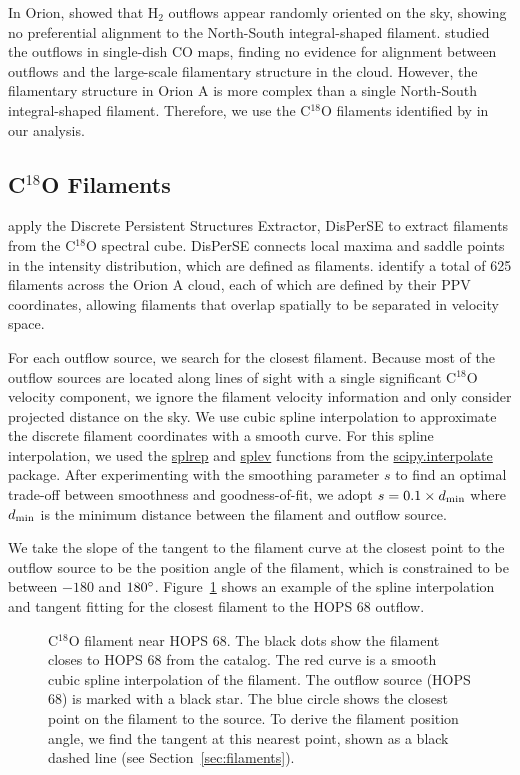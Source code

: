 \documentclass[twocolumn]{aastex63}
\newcommand{\example}{HOPS 68}
\begin{document}
In Orion, \citet{Davis09} showed that H$_{2}$ outflows appear randomly oriented on the sky, showing no preferential alignment to the North-South integral-shaped filament. \citet{Tanabe:submitted} studied the outflows in single-dish CO maps, finding no evidence for alignment between outflows and the large-scale filamentary structure in the cloud. However, the filamentary structure in Orion A is more complex than a single North-South integral-shaped filament. Therefore, we use the C$^{18}$O filaments identified by \citet{Suri19} in our analysis.

\subsection{C$^{18}$O Filaments}
\citet{Suri19} apply the Discrete Persistent Structures Extractor, DisPerSE \citep{Sousbie11} to extract filaments from the C$^{18}$O spectral cube. DisPerSE connects local maxima and saddle points in the intensity distribution, which are defined as filaments. \citet{Suri19} identify a total of 625 filaments across the Orion A cloud, each of which are defined by their PPV coordinates, allowing filaments that overlap spatially to be separated in velocity space. 

For each outflow source, we search for the closest filament. Because most of the outflow sources are located along lines of sight with a single significant C$^{18}$O velocity component, we ignore the filament velocity information and only consider projected distance on the sky. We use cubic spline interpolation to approximate the discrete filament coordinates with a smooth curve. For this spline interpolation, we used the \url{splrep} and \url{splev} functions from the \url{scipy.interpolate} package. After experimenting with the smoothing parameter $s$ to find an optimal trade-off between smoothness and goodness-of-fit, we adopt $s = 0.1\times d_{\rm min}$ where $d_{\rm min}$ is the minimum distance between the filament and outflow source.

We take the slope of the tangent to the filament curve at the closest point to the outflow source to be the position angle of the filament, which is constrained to be between $-180$ and $180\mbox{$^\circ$}$. Figure~\ref{fig:filament} shows an example of the spline interpolation and tangent fitting for the closest filament to the \example{} outflow.

\begin{figure}
\caption{C$^{18}$O filament near \example{}. The black dots show the filament closes to \example{} from the \citet{Suri19} catalog. The red curve is a smooth cubic spline interpolation of the filament. The outflow source (\example{}) is marked with a black star. The blue circle shows the closest point on the filament to the source. To derive the filament position angle, we find the tangent at this nearest point, shown as a black dashed line (see Section~\ref{sec:filaments}).\label{fig:filament}}
\end{figure}
\end{document}
